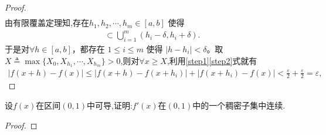 \documentclass[../../main.tex]{subfiles}%
\begin{document}
\begin{proof}
\begin{align*}
\end{align*}
由有限覆盖定理知,存在$h_1, h_2, \cdots, h_m \in [a, b]$ 使得
\begin{align*}
[a, b] \subset \bigcup\limits_{i=1}^m (h_i - \delta, h_i + \delta).
\end{align*}
于是对$\forall h \in [a, b]$，都存在 $1 \leqslant i \leqslant m$ 使得 $|h - h_i| < \delta$。取$X \triangleq \max\{X_0, X_{h_1}, \cdots, X_{h_m}\} > 0$,则对$\forall x \geqslant X$,利用\eqref{step1}\eqref{step2}式就有
\begin{align*}
|f(x + h) - f(x)| \leqslant |f(x + h) - f(x + h_i)| + |f(x + h_i) - f(x)|< \frac{\varepsilon}{2} + \frac{\varepsilon}{2} = \varepsilon,
\end{align*}
\end{proof}

\begin{example}
设\(f(x)\)在区间\((0,1)\)中可导,证明:\(f'(x)\)在\((0,1)\)中的一个稠密子集中连续.
\end{example}
\begin{proof}

\end{proof}
\end{document}
